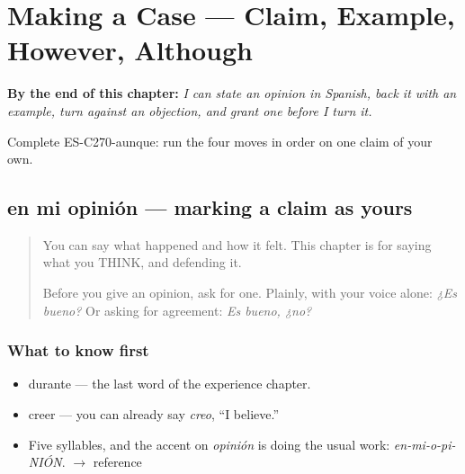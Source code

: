 
\chapter{Making a Case --- Claim, Example, However, Although}
\label{ch:argumentar}

\begin{chapteropening}
\textbf{By the end of this chapter:} \emph{I can state an opinion in Spanish, back it with an example, turn against an objection, and grant one before I turn it.}

Complete ES-C270-aunque: run the four moves in order on one claim of your own.
\end{chapteropening}

\section[en mi opinión]{en mi opinión — marking a claim as yours}

\label{lesson:ES-C270-en-mi-opinion}



\begin{quote}
You can say what happened and how it felt. This chapter is for saying what you THINK, and defending it.

Before you give an opinion, ask for one. Plainly, with your voice alone: \emph{¿Es bueno?} Or asking for agreement: \emph{Es bueno, ¿no?}
\end{quote}

\subsection*{What to know first}
\begin{itemize}
\raggedright
  \item durante — the last word of the experience chapter.
  \item creer — you can already say \emph{creo}, \textquotedblleft{}I believe.\textquotedblright{}
\end{itemize}

\begin{sounds}
\begin{itemize}
\raggedright
  \item Five syllables, and the accent on \emph{opinión} is doing the usual work: \emph{en-mi-o-pi-NIÓN}. $\to$ reference
\end{itemize}
\end{sounds}

